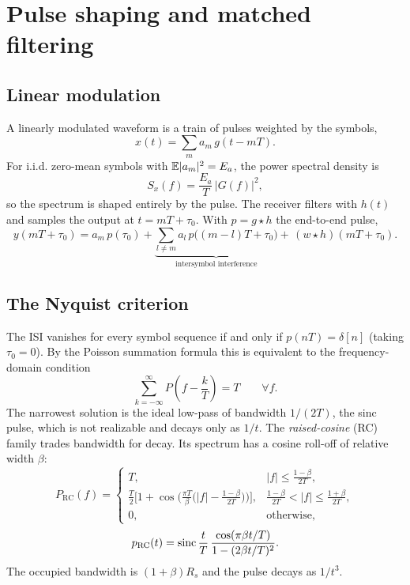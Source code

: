 \chapter{Pulse shaping and matched filtering}\label{ch:pulse}

\section{Linear modulation}
A linearly modulated waveform is a train of pulses weighted by the symbols,
\begin{equation}
  x(t)=\sum_m a_m\,g(t-mT).
\end{equation}
For i.i.d. zero-mean symbols with $\mathbb{E}|a_m|^2=E_a$, the power spectral density is
\begin{equation}
  S_x(f)=\frac{E_a}{T}\,|G(f)|^2 ,
  \label{eq:linear-psd}
\end{equation}
so the spectrum is shaped entirely by the pulse. The receiver filters with $h(t)$ and samples
the output at $t=mT+\tau_0$. With $p=g\star h$ the end-to-end pulse,
\begin{equation}
  y(mT+\tau_0)=a_m\,p(\tau_0)+\underbrace{\sum_{l\neq m}a_l\,p\big((m-l)T+\tau_0\big)}_{\text{intersymbol interference}}+\,(w\star h)(mT+\tau_0).
\end{equation}

\section{The Nyquist criterion}
The ISI vanishes for every symbol sequence if and only if $p(nT)=\delta[n]$ (taking
$\tau_0=0$). By the Poisson summation formula this is equivalent to the frequency-domain
condition
\begin{equation}
  \sum_{k=-\infty}^{\infty}P\!\left(f-\frac kT\right)=T\qquad\forall f .
  \label{eq:nyquist}
\end{equation}
The narrowest solution is the ideal low-pass of bandwidth $1/(2T)$, the sinc pulse, which is
not realizable and decays only as $1/t$. The \emph{raised-cosine} (RC) family trades bandwidth
for decay. Its spectrum has a cosine roll-off of relative width $\beta$:
\begin{equation}
  P_{\mathrm{RC}}(f)=
  \begin{cases}
    T, & |f|\le\frac{1-\beta}{2T},\\[2pt]
    \frac T2\Big[1+\cos\Big(\frac{\pi T}{\beta}\big(|f|-\frac{1-\beta}{2T}\big)\Big)\Big], & \frac{1-\beta}{2T}<|f|\le\frac{1+\beta}{2T},\\[2pt]
    0, & \text{otherwise},
  \end{cases}
\end{equation}
\begin{equation}
  p_{\mathrm{RC}}(t)=\operatorname{sinc}\frac tT\,\frac{\cos(\pi\beta t/T)}{1-(2\beta t/T)^2}.
\end{equation}
The occupied bandwidth is $(1+\beta)R_s$ and the pulse decays as $1/t^3$.

